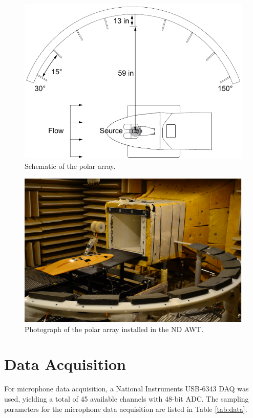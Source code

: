 \begin{figure}
	\begin{center}
		\centerline{\includegraphics[scale=1.2]{figures/array_schematic}}
		\caption{Schematic of the polar array.}
		\label{fig:array}
	\end{center}
\end{figure}

\begin{figure}
	\begin{center}
		\centerline{\includegraphics[scale=1.0]{figures/arraypic}}
		\caption{Photograph of the polar array installed in the ND AWT.}
		\label{fig:arraypic}
	\end{center}
\end{figure}


\section{Data Acquisition}
For microphone data acquisition, a National Instruments USB-6343 DAQ was used, yielding a total of 45 available channels with 48-bit ADC. The sampling parameters for the microphone data acquisition are listed in Table \ref{tab:data}.

